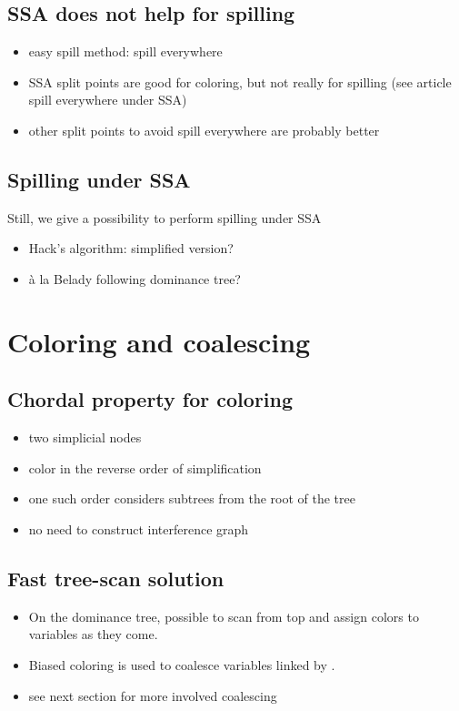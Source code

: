 \subsection{SSA does not help for spilling}
\begin{itemize}
  \item easy spill method: spill everywhere
  \item SSA split points are good for coloring, but not really for spilling 
    (see article spill everywhere under SSA)
  \item other split points to avoid spill everywhere are probably better
\end{itemize}


\subsection{Spilling under SSA}
Still, we give a possibility to perform spilling under SSA
\begin{itemize}
  \item Hack's algorithm: simplified version?
  \item \`a la Belady following dominance tree?
\end{itemize}



\section{Coloring and coalescing}
\subsection{Chordal property for coloring}
\begin{itemize}
  \item two simplicial nodes
  \item color in the reverse order of simplification
  \item one such order considers subtrees from the root of the tree
  \item no need to construct interference graph
\end{itemize}

\subsection{Fast tree-scan solution}
\begin{itemize}
  \item On the dominance tree, possible to scan from top and assign colors to 
    variables as they come.
  \item Biased coloring is used to coalesce variables linked by \phifuns.
  \item see next section for more involved coalescing
\end{itemize}



